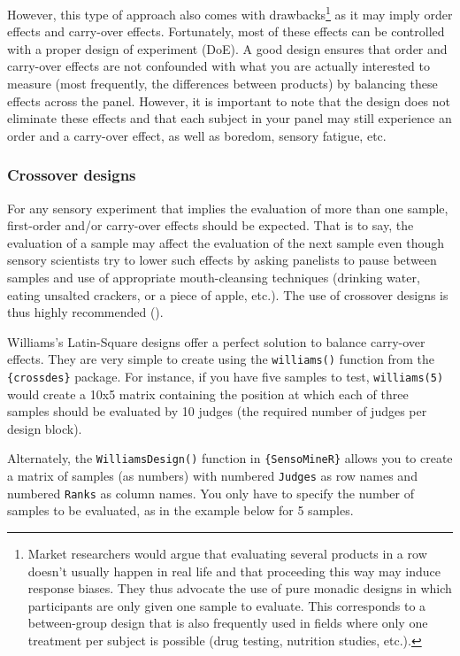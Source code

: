 \documentclass[
]{book}
\begin{document}
However, this type of approach also comes with drawbacks\footnote{Market researchers would argue that evaluating several products in a row doesn't usually happen in real life and that proceeding this way may induce response biases. They thus advocate the use of pure monadic designs in which participants are only given one sample to evaluate. This corresponds to a between-group design that is also frequently used in fields where only one treatment per subject is possible (drug testing, nutrition studies, etc.).} as it may imply order effects and carry-over effects. Fortunately, most of these effects can be controlled with a proper design of experiment (DoE). A good design ensures that order and carry-over effects are not confounded with what you are actually interested to measure (most frequently, the differences between products) by balancing these effects across the panel. However, it is important to note that the design does not eliminate these effects and that each subject in your panel may still experience an order and a carry-over effect, as well as boredom, sensory fatigue, etc.

\hypertarget{crossover-designs}{%
\subsubsection{Crossover designs}\label{crossover-designs}}

For any sensory experiment that implies the evaluation of more than one sample, first-order and/or carry-over effects should be expected. That is to say, the evaluation of a sample may affect the evaluation of the next sample even though sensory scientists try to lower such effects by asking panelists to pause between samples and use of appropriate mouth-cleansing techniques (drinking water, eating unsalted crackers, or a piece of apple, etc.). The use of crossover designs is thus highly recommended (\citet{Macfie1989}).

Williams's Latin-Square designs offer a perfect solution to balance carry-over effects. They are very simple to create using the \texttt{williams()} function from the \texttt{\{crossdes\}} package. For instance, if you have five samples to test, \texttt{williams(5)} would create a 10x5 matrix containing the position at which each of three samples should be evaluated by 10 judges (the required number of judges per design block).

Alternately, the \texttt{WilliamsDesign()} function in \texttt{\{SensoMineR\}} allows you to create a matrix of samples (as numbers) with numbered \texttt{Judges} as row names and numbered \texttt{Ranks} as column names. You only have to specify the number of samples to be evaluated, as in the example below for 5 samples.
\end{document}
